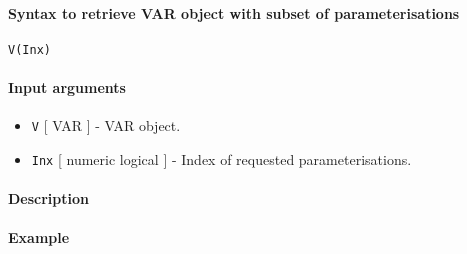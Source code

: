 


	\paragraph{Syntax to retrieve VAR object with subset of
parameterisations}\label{syntax-to-retrieve-var-object-with-subset-of-parameterisations}

\begin{verbatim}
V(Inx)
\end{verbatim}

\paragraph{Input arguments}\label{input-arguments}

\begin{itemize}
\item
  \texttt{V} {[} VAR {]} - VAR object.
\item
  \texttt{Inx} {[} numeric \textbar{} logical {]} - Index of requested
  parameterisations.
\end{itemize}

\paragraph{Description}\label{description}

\paragraph{Example}\label{example}


